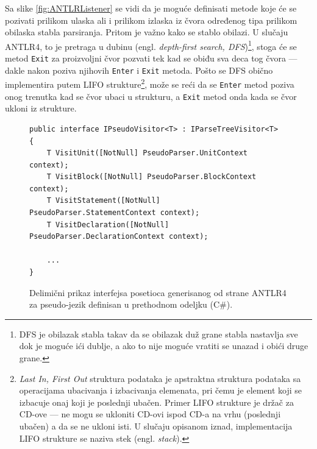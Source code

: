 Sa slike \ref{fig:ANTLRListener} se vidi da je moguće definisati metode koje će se pozivati prilikom ulaska ali i prilikom izlaska iz čvora određenog tipa prilikom obilaska stabla parsiranja. Pritom je važno kako se stablo obilazi. U slučaju ANTLR4, to je pretraga u dubinu (engl. \emph{depth-first search, DFS})\footnote{DFS je obilazak stabla takav da se obilazak duž grane stabla nastavlja sve dok je moguće ići dublje, a ako to nije moguće vratiti se unazad i obići druge grane.}, stoga će se metod \texttt{Exit} za proizvoljni čvor pozvati tek kad se obiđu sva deca tog čvora --- dakle nakon poziva njihovih \texttt{Enter} i \texttt{Exit} metoda. Pošto se DFS obično implementira putem LIFO strukture\footnote{\emph{Last In, First Out} struktura podataka je apstraktna struktura podataka sa operacijama ubacivanja i izbacivanja elemenata, pri čemu je element koji se izbacuje onaj koji je poslednji ubačen. Primer LIFO strukture je držač za CD-ove --- ne mogu se ukloniti CD-ovi ispod CD-a na vrhu (poslednji ubačen) a da se ne ukloni isti. U slučaju opisanom iznad, implementacija LIFO strukture se naziva stek (engl. \emph{stack}).}, može se reći da se \texttt{Enter} metod poziva onog trenutka kad se čvor ubaci u strukturu, a \texttt{Exit} metod onda kada se čvor ukloni iz strukture.

\begin{figure}[h!]
\begin{lstlisting}
public interface IPseudoVisitor<T> : IParseTreeVisitor<T>
{
    T VisitUnit([NotNull] PseudoParser.UnitContext context);
    T VisitBlock([NotNull] PseudoParser.BlockContext context);
    T VisitStatement([NotNull] PseudoParser.StatementContext context);
    T VisitDeclaration([NotNull] PseudoParser.DeclarationContext context);
    
    ...
}
\end{lstlisting}
\caption{Delimični prikaz interfejsa posetioca generisanog od strane ANTLR4 za pseudo-jezik definisan u prethodnom odeljku (C\#).}
\label{fig:ANTLRVisitor}
\end{figure}

